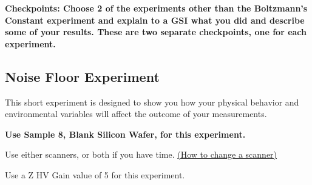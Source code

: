 \documentclass{../lab}
\begin{document}
\textbf{Checkpoints: Choose 2 of the experiments other than the Boltzmann's Constant experiment and explain to a GSI what you did and describe some of your results. These are two separate checkpoints, one for each experiment.}

\subsection{Noise Floor Experiment}
\label{subsec:NoiseFloor}

This short experiment is designed to show you how your physical behavior and environmental variables will affect the outcome of your measurements.

\textbf{Use Sample 8, Blank Silicon Wafer, for this experiment.}

Use either scanners, or both if you have time. \hyperref[subsec:ChangingScanners]{(How to change a scanner)}

Use a Z HV Gain value of 5 for this experiment.
\end{document}
